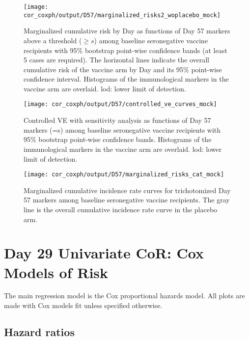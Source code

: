 \documentclass[
]{article}
\begin{document}
\begin{figure}[H]
    \centering
    \texttt{[image: cor\_coxph/output/D57/marginalized\_risks2\_woplacebo\_mock]}
    \caption{Marginalized cumulative risk by Day \protect as functions of Day 57 markers above a threshold ($\geq s$) among baseline seronegative vaccine recipients with 95\% bootstrap point-wise confidence bands (at least 5 cases are required). The horizontal lines indicate the overall cumulative risk of the vaccine arm by Day \protect and its 95\% point-wise confidence interval. Histograms of the immunological markers in the vaccine arm are overlaid. lod: lower limit of detection.}
\end{figure}

\begin{figure}[H]
    \centering
    \texttt{[image: cor\_coxph/output/D57/controlled\_ve\_curves\_mock]}
    \caption{Controlled VE with sensitivity analysis as functions of Day 57 markers (=s) among baseline seronegative vaccine recipients with 95\% bootstrap point-wise confidence bands. Histograms of the immunological markers in the vaccine arm are overlaid. lod: lower limit of detection.}
\end{figure}

\begin{figure}[H]
    \centering
    \texttt{[image: cor\_coxph/output/D57/marginalized\_risks\_cat\_mock]}
    \caption{Marginalized cumulative incidence rate curves for trichotomized Day 57 markers among baseline seronegative vaccine recipients. The gray line is the overall cumulative incidence rate curve in the placebo arm.}
\end{figure}

\clearpage

\renewcommand{\pathCoRoutput}{cor_coxph/output/D29}

\hypertarget{cor-coxph}{%
\section{Day 29 Univariate CoR: Cox Models of Risk}\label{cor-coxph}}

The main regression model is the Cox proportional hazards model. All plots are made with Cox models fit unless specified otherwise.

\hypertarget{hazard-ratios-1}{%
\subsection{Hazard ratios}\label{hazard-ratios-1}}
\end{document}
